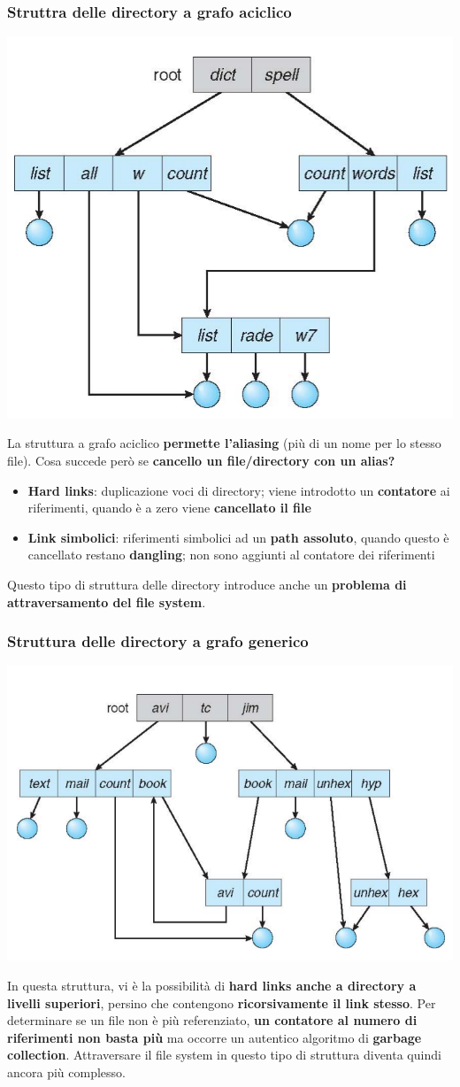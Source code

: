 \documentclass[12pt]{article}
\begin{document}
\subsubsection{Struttra delle directory a grafo aciclico}
\begin{center}
    \includegraphics[width = 0.50\linewidth]{Images/28.png}
\end{center}
La struttura a grafo aciclico \textbf{permette l'aliasing} (più di un nome per lo stesso file).
Cosa succede però se \textbf{cancello un file/directory con un alias?}
\begin{itemize}
    \item \textbf{Hard links}: duplicazione voci di directory; viene introdotto un \textbf{contatore} ai riferimenti, quando è a zero viene \textbf{cancellato il file}
    \item \textbf{Link simbolici}: riferimenti simbolici ad un \textbf{path assoluto}, quando questo è cancellato restano \textbf{dangling}; non sono aggiunti al contatore dei riferimenti
\end{itemize}
Questo tipo di struttura delle directory introduce anche un \textbf{problema di attraversamento del file system}.
\subsubsection{Struttura delle directory a grafo generico}
\begin{center}
    \includegraphics[width = 0.60\linewidth]{Images/29.png}
\end{center}
In questa struttura, vi è la possibilità di \textbf{hard links anche a directory a livelli superiori}, persino che contengono \textbf{ricorsivamente il link stesso}.
Per determinare se un file non è più referenziato, \textbf{un contatore al numero di riferimenti non basta più} ma occorre un autentico algoritmo di \textbf{garbage collection}.
Attraversare il file system in questo tipo di struttura diventa quindi ancora più complesso.
\end{document}
